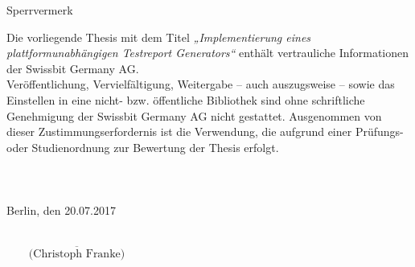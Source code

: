 
\begin{titlepage}		%



	{\Huge Sperrvermerk} 
		\vspace{60mm}	

	\vspace*{-10mm}
	
	
	Die vorliegende Thesis mit dem Titel \textit{„Implementierung eines plattformunabhängigen Testreport Generators“} enthält vertrauliche Informationen der Swissbit Germany AG.\\
	

	
	Veröffentlichung, Vervielfältigung, Weitergabe – auch auszugsweise – sowie das Einstellen in eine nicht- bzw. öffentliche Bibliothek sind ohne schriftliche Genehmigung der Swissbit Germany AG nicht gestattet. Ausgenommen von dieser Zustimmungserfordernis ist die Verwendung, die aufgrund einer Prüfungs- oder Studienordnung zur Bewertung der Thesis erfolgt.\\\\\\\\
	
	
	\noindent Berlin, den 20.07.2017 \\\\
	\begin{flushright}
		$\overline{~~~~~~~~~\mbox{(Christoph Franke)}~~~~~~~~~}$
	\end{flushright}
	

	
\end{titlepage}





